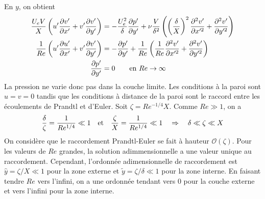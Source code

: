       En $y$, on obtient
      \begin{equation}
        \begin{aligned}
          \frac{U_e V}{X} \left(u' \pdv{v'}{x'} + v' \pdv{v'}{y'}\right) &= - \frac{U_e^2}{\delta}\pdv{p'}{y'} + \nu \frac{V}{\delta^2} \left(\left(\frac{\delta}{X}\right)^2 \frac{\partial^2 v^\prime}{\partial x^{\prime 2}} + \frac{\partial^2 v^\prime}{\partial y^{\prime 2}} \right)\\
          \frac{1}{Re} \left(u' \pdv{u'}{x'} + v'\pdv{v'}{y'}\right) &= -\pdv{p'}{y'} + \frac{1}{Re} \left(\frac{1}{Re}\frac{\partial^2 v^\prime}{\partial x^{\prime 2}} + \frac{\partial^2 v^\prime}{\partial y^{\prime 2}}\right)\\
          \pdv{p'}{y'} &= 0 \quad \quad \textrm{en } Re \rightarrow \infty
        \end{aligned}
      \end{equation}
      La pression ne varie donc pas dans la couche limite. Les conditions à la paroi sont $u = v = 0$ tandis que les conditions à distance de la paroi sont le raccord entre les écoulements de Prandtl et d'Euler. Soit $\zeta = Re^{-1/4} X$. Comme $Re \gg 1$, on a
      \begin{equation}
        \frac{\delta}{\zeta} = \frac{1}{Re^{1/4}} \ll 1 \quad \textrm{et} \quad \frac{\zeta}{X} = \frac{1}{Re^{1/4}} \ll 1 \quad \Rightarrow \quad \delta \ll \zeta \ll X
      \end{equation}
      On considère que le raccordement Prandtl-Euler se fait à hauteur $\mathcal{O}(\zeta)$. Pour les valeurs de $Re$ grandes, la solution adimmensionnelle a une valeur unique au raccordement. Cependant, l'ordonnée adimensionnelle de raccordement est $\hat{y} = \zeta/X \ll 1$ pour la zone externe et $\tilde{y} = \zeta/\delta \ll 1$ pour la zone interne. En faisant tendre $Re$ vers l'infini, on a une ordonnée tendant vers $0$ pour la couche externe  et vers l'infini pour la zone interne.

